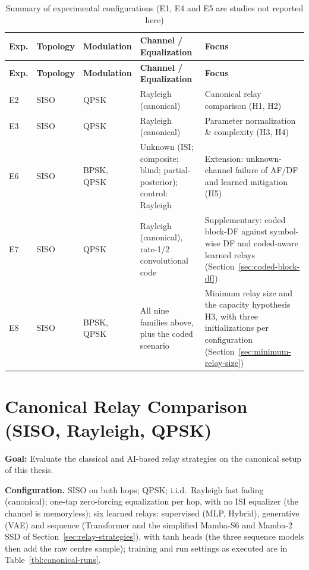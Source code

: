 \begin{longtable}{p{0.9cm} p{2.2cm} p{2.1cm} p{3.6cm} p{3.9cm}}
\caption[Summary of experimental configurations]{Summary of experimental configurations (E1, E4 and E5 are studies not reported here)}
\label{tab:experiment-summary}\\
\hline
\textbf{Exp.} &
\textbf{Topology} &
\textbf{Modulation} &
\textbf{Channel / Equalization} &
\textbf{Focus} \\
\hline
\endfirsthead

\hline
\textbf{Exp.} &
\textbf{Topology} &
\textbf{Modulation} &
\textbf{Channel / Equalization} &
\textbf{Focus} \\
\hline
\endhead

E2 & SISO & QPSK &
Rayleigh (canonical) &
Canonical relay comparison (H1, H2) \\
\hline

E3 & SISO & QPSK &
Rayleigh (canonical) &
Parameter normalization \& complexity (H3, H4) \\
\hline

E6 & SISO & BPSK, QPSK &
Unknown (ISI; composite; blind; partial-posterior); control: Rayleigh &
Extension: unknown-channel failure of AF/DF and learned mitigation (H5) \\
\hline

E7 & SISO & QPSK &
Rayleigh (canonical), rate-1/2 convolutional code &
Supplementary: coded block-DF against symbol-wise DF and coded-aware learned relays (Section~\ref{sec:coded-block-df}) \\
\hline

E8 & SISO & BPSK, QPSK &
All nine families above, plus the coded scenario &
Minimum relay size and the capacity hypothesis H3, with three initializations per configuration (Section~\ref{sec:minimum-relay-size}) \\

\hline
\end{longtable}

\section{Canonical Relay Comparison (SISO, Rayleigh, QPSK)}\label{sec:siso-bpsk-performance-baseline-relay-comparison}

\textbf{Goal:} Evaluate the classical and AI-based relay strategies on the canonical setup of this thesis.

\textbf{Configuration.} SISO on both hops; QPSK; i.i.d.\ Rayleigh fast fading (canonical); one-tap zero-forcing equalization per hop, with no ISI equalizer (the channel is memoryless); six learned relays: supervised (MLP, Hybrid), generative (VAE) and sequence (Transformer and the simplified Mamba-S6 and Mamba-2 SSD of Section~\ref{sec:relay-strategies}), with tanh heads (the three sequence models then add the raw centre sample); training and run settings as executed are in Table~\ref{tbl:canonical-runs}.

